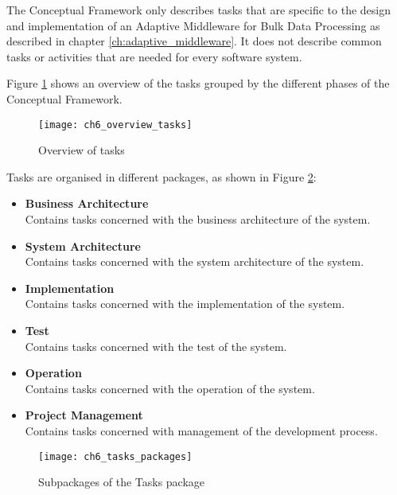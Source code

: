 The Conceptual Framework only describes tasks that are specific to the design and implementation of an Adaptive Middleware for Bulk Data Processing as described in chapter \ref{ch:adaptive_middleware}. It does not describe common tasks or activities that are needed for every software system.

Figure \ref{fig:ch6_overview_tasks} shows an overview of the tasks grouped by the different phases of the Conceptual Framework.

\begin{figure}[htpb] \centering 
	\texttt{[image: ch6\_overview\_tasks]} 
	\caption{Overview of tasks} 
	\label{fig:ch6_overview_tasks} 
\end{figure}

Tasks are organised in different packages, as shown in Figure \ref{fig:ch6_tasks_packages}:
\begin{itemize}
	\item \textbf{Business Architecture}\\
	Contains tasks concerned with the business architecture of the system.
	\item \textbf{System Architecture}\\
	Contains tasks concerned with the system architecture of the system.
	\item \textbf{Implementation}\\
	Contains tasks concerned with the implementation of the system.
	\item \textbf{Test}\\
	Contains tasks concerned with the test of the system.
	\item \textbf{Operation}\\
	Contains tasks concerned with the operation of the system.
	\item \textbf{Project Management}\\
	Contains tasks concerned with management of the development process.
\end{itemize}

\begin{figure}[htpb] \centering 
	\texttt{[image: ch6\_tasks\_packages]} 
	\caption{Subpackages of the Tasks package} 
	\label{fig:ch6_tasks_packages} 
\end{figure}


